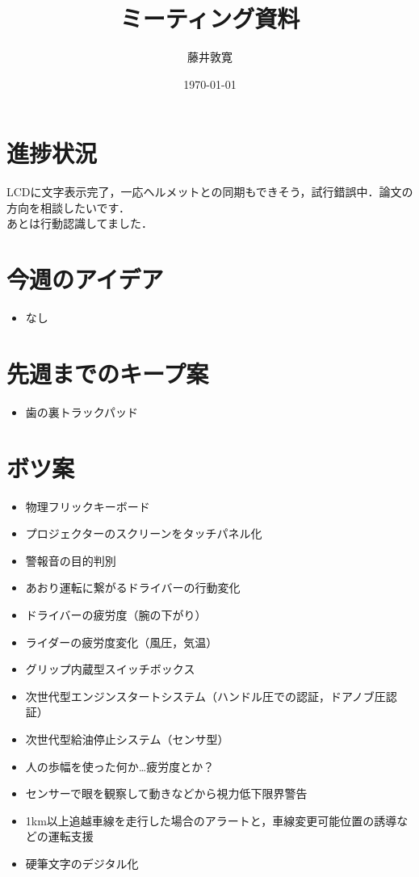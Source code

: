 \documentclass[a4j,twocolumn,10pt]{jarticle}
\title{ミーティング資料}
\author{藤井敦寛}
\date{\today}
\begin{document}
\maketitle

\section{進捗状況}
LCDに文字表示完了，一応ヘルメットとの同期もできそう，試行錯誤中．論文の方向を相談したいです．\\
あとは行動認識してました．



\section{今週のアイデア}
\begin{itemize}
  \item なし
\end{itemize}

\section{先週までのキープ案}
\begin{itemize}
  \item 歯の裏トラックパッド
\end{itemize}


\section{ボツ案}
\begin{itemize}
  \item 物理フリックキーボード
  \item プロジェクターのスクリーンをタッチパネル化
  \item 警報音の目的判別
  \item あおり運転に繋がるドライバーの行動変化
  \item ドライバーの疲労度（腕の下がり）
  \item ライダーの疲労度変化（風圧，気温）
  \item グリップ内蔵型スイッチボックス
  \item 次世代型エンジンスタートシステム（ハンドル圧での認証，ドアノブ圧認証）
  \item 次世代型給油停止システム（センサ型）
  \item 人の歩幅を使った何か…疲労度とか？
  \item センサーで眼を観察して動きなどから視力低下限界警告
  \item 1km以上追越車線を走行した場合のアラートと，車線変更可能位置の誘導などの運転支援
  \item 硬筆文字のデジタル化
\end{itemize}
\end{document}
